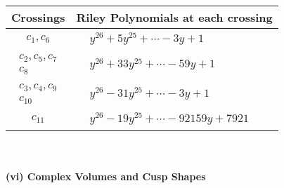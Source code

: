 \documentclass[1p]{elsarticle_modified}
\theoremstyle{definition}
\begin{document}
\begin{tabular}{m{50pt}|m{274pt}}
Crossings & \hspace{64pt}Riley Polynomials at each crossing \\
\hline $$\begin{aligned}c_{1},c_{6}\end{aligned}$$&$\begin{aligned}
&y^{26}+5 y^{25}+\cdots-3 y+1
\end{aligned}$\\
\hline $$\begin{aligned}c_{2},c_{5},c_{7}\\c_{8}\end{aligned}$$&$\begin{aligned}
&y^{26}+33 y^{25}+\cdots-59 y+1
\end{aligned}$\\
\hline $$\begin{aligned}c_{3},c_{4},c_{9}\\c_{10}\end{aligned}$$&$\begin{aligned}
&y^{26}-31 y^{25}+\cdots-3 y+1
\end{aligned}$\\
\hline $$\begin{aligned}c_{11}\end{aligned}$$&$\begin{aligned}
&y^{26}-19 y^{25}+\cdots-92159 y+7921
\end{aligned}$\\
\hline
\end{tabular}\\~\\
\newpage\flushleft \textbf{(vi) Complex Volumes and Cusp Shapes}
\end{document}
